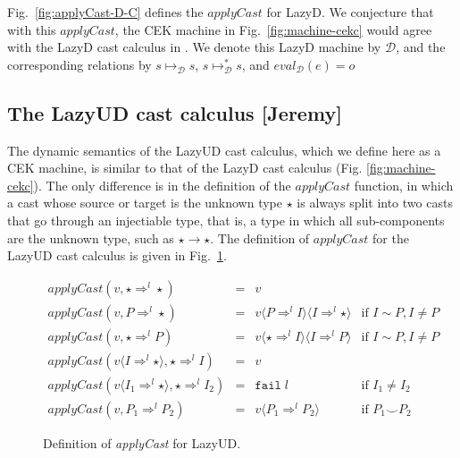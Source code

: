 \documentclass[acmsmall,review,anonymous]{acmart}\settopmatter{printfolios=true,printccs=false,printacmref=false}
\newcommand{\figref}[1]{Fig.~\ref{#1}}
\newcommand{\stxrule}[3]{#1 & ::= & #3 & \text{#2}\\}
\newcommand{\lazyUD}{Lazy\;UD}
\newcommand{\lazyD}{Lazy\;D}
\newcommand{\cOOcast}[3]{#1 \Rightarrow^{#2} #3}
\newcommand{\vOOcast}[2]{#1\langle#2\rangle}
\newcommand{\rOOfail}[1]{\mathtt{fail}\;#1}
\newcommand{\ineffCEKD}{$ \mathcal{D} $}
\newcommand{\judgeDreduce}[2]{#1 \longmapsto_{\mathcal{D}} #2}
\newcommand{\judgeDreduceTrans}[2]{#1 \longmapsto_{\mathcal{D}}^{*} #2}
\newcommand{\judgeDeval}[2]{eval_{\mathcal{D}}(#1) = #2}
\begin{document}
\figref{fig:applyCast-D-C} defines the $ applyCast $ for \lazyD. 
We conjecture that with this $ applyCast $, the CEK machine in 
\figref{fig:machine-cekc} would agree with the \lazyD{} cast calculus in 
\citet{siek2009exploring}. We denote this \lazyD{} machine by \ineffCEKD{},
and the corresponding relations by $ \judgeDreduce{s}{s} $, $ 
\judgeDreduceTrans{s}{s} $, and $ \judgeDeval{e}{o} $

\subsection{The \lazyUD{} cast calculus [Jeremy]}


The dynamic semantics of the \lazyUD{} cast calculus, which we define here as a
CEK machine, is similar to that of the \lazyD{} cast calculus
(Fig. \ref{fig:machine-cekc}). The only difference is in the definition of
the $\mathit{applyCast}$ function, in which a cast whose source or
target is the unknown type $\star$ is always split into two casts that
go through an injectiable type, that is, a type in which all
sub-components are the unknown type, such as $\star \to \star$. The
definition of $\mathit{applyCast}$ for the \lazyUD{} cast calculus is given in
Fig.~\ref{fig:apply-Cast-UD}.

\begin{figure}
%
%  
  \[
  \begin{array}{rclr}
    \mathit{applyCast}(v, \cOOcast{\star}{l}{\star} ) &=& v \\
    \mathit{applyCast}(v, \cOOcast{P}{l}{\star}) &=&
        v \langle \cOOcast{P}{l}{I} \rangle
          \langle \cOOcast{I}{l}{\star} \rangle
        & \text{if } I \sim P, I \neq P \\  
    \mathit{applyCast}(v, \cOOcast{\star}{l}{P}) &=&          
        v \langle \cOOcast{\star}{l}{I} \rangle
          \langle \cOOcast{I}{l}{P} \rangle
        & \text{if } I \sim P, I \neq P \\  
  \mathit{applyCast}(v \langle \cOOcast{I}{l}{\star} \rangle , \cOOcast{\star}{l}{I}) &=& v \\
  \mathit{applyCast}(v \langle \cOOcast{I_1}{l}{\star} \rangle , \cOOcast{\star}{l}{I_2}) &=& \rOOfail{l} & \text{if } I_1 \neq I_2 \\
  \mathit{applyCast}(v, \cOOcast{P_1}{l}{P_2}) &=&
     v \langle \cOOcast{P_1}{l}{P_2} \rangle & \text{if } P_1 \smile P_2
  \end{array}
  \]


  \caption{Definition of \textit{applyCast} for \lazyUD{}.}
  \label{fig:apply-Cast-UD}
\end{figure}
\end{document}
